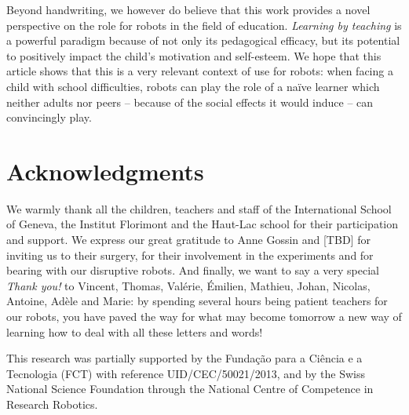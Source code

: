 \documentclass{article}
\begin{document}
Beyond handwriting, we however do believe that this work provides a novel
perspective on the role for robots in the field of education. \emph{Learning by
teaching} is a powerful paradigm because of not only its pedagogical efficacy,
but its potential to positively impact the child's motivation and self-esteem.
We hope that this article shows that this is a very relevant context of use for
robots: when facing a child with school difficulties, robots can play the role
of a naïve learner which neither adults nor peers -- because of the social
effects it would induce -- can convincingly play.


\section*{Acknowledgments}

We warmly thank all the children, teachers and staff of the International School
of Geneva, the Institut Florimont and the Haut-Lac school for their
participation and support. We express our great gratitude to Anne Gossin and [TBD] for
inviting us to their surgery, for their involvement in the experiments and for
bearing with our disruptive robots. And finally, we want to say a very special \emph{Thank
you!} to Vincent, Thomas, Valérie, Émilien, Mathieu, Johan, Nicolas, Antoine,
Adèle and Marie: by spending several hours being patient teachers for our
robots, you have paved the way for what may become tomorrow a new way of
learning how to deal with all these letters and words!

This research was partially supported by the Funda\c{c}\~{a}o para a Ci\^{e}ncia
e a Tecnologia (FCT) with reference UID/CEC/50021/2013, and by the Swiss
National Science Foundation through the National Centre of Competence in
Research Robotics.



\end{document}
